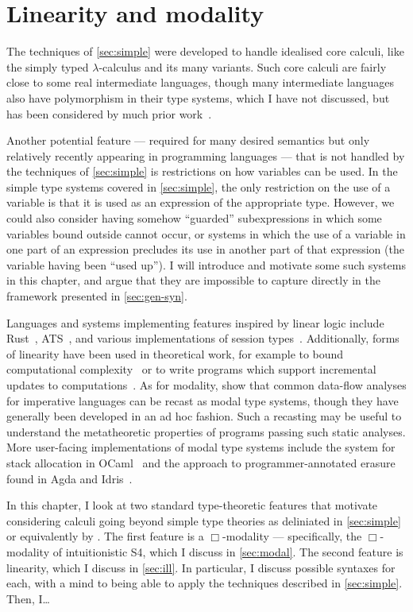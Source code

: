 \chapter{Linearity and modality}\label{sec:linearity}

The techniques of \cref{sec:simple} were developed to handle idealised core
calculi, like the simply typed $\lambda$-calculus and its many variants.
Such core calculi are fairly close to some real intermediate languages,
 though many intermediate languages also have polymorphism in their
type systems, which I have not discussed, but has been considered by much prior
work~\citep{POPLmark}.

Another potential feature --- required for many desired semantics but only
relatively recently appearing in programming languages --- that is not handled
by the techniques of \cref{sec:simple} is restrictions on how variables can be
used.
In the simple type systems covered in \cref{sec:simple}, the only restriction on
the use of a variable is that it is used as an expression of the appropriate
type.
However, we could also consider having somehow ``guarded'' subexpressions in
which some variables bound outside cannot occur, or systems in which the use of
a variable in one part of an expression precludes its use in another part of
that expression (the variable having been ``used up'').
I will introduce and motivate some such systems in this chapter, and argue that
they are impossible to capture directly in the framework presented in
\cref{sec:gen-syn}.

Languages and systems implementing features inspired by linear logic include
Rust~\citep{MK14,Rust}, ATS~\citep{Xi04,ZX05}, and various implementations of
session types~\citep{HLVCCDMPRTVTZ16}.
Additionally, forms of linearity have been used in theoretical work, for example
to bound computational complexity~\citep{GSS92,Hofmann03} or to write programs
which support incremental updates to computations~\citep{ER03,Ehrhard18}.
As for modality, \citet{IMO20} show that common data-flow analyses for
imperative languages can be recast as modal type systems, though they have
generally been developed in an ad hoc fashion.
Such a recasting may be useful to understand the metatheoretic properties of
programs passing such static analyses.
More user-facing implementations of modal type systems include the system for
stack allocation in OCaml~\citep{DW22} and the approach to programmer-annotated
erasure found in Agda and Idris~\citep{Atkey18}.

In this chapter, I look at two standard type-theoretic features that motivate
considering calculi going beyond simple type theories as deliniated in
\cref{sec:simple} or equivalently by \citet{AACMM21}.
The first feature is a $\Box$-modality --- specifically, the $\Box$-modality of
intuitionistic S4, which I discuss in \cref{sec:modal}.
The second feature is linearity, which I discuss in \cref{sec:ill}.
In particular, I discuss possible syntaxes for each, with a mind to
being able to apply the techniques described in \cref{sec:simple}.
Then, I\ldots

